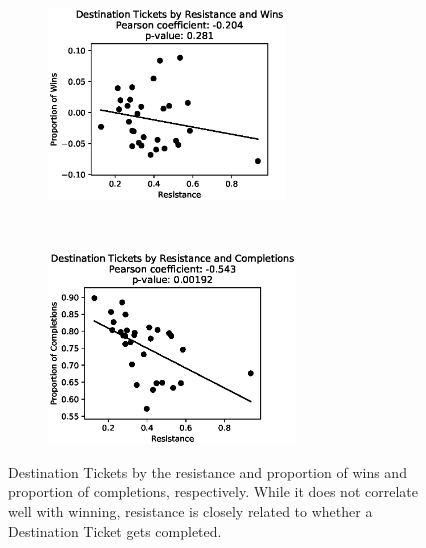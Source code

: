 \begin{figure}[H]
    \centering
    \begin{subfigure}[t]{0.5\textwidth}
        \centering
        \includegraphics[height=2in]{figures/correlation1}
    \end{subfigure}%
    ~ 
    \begin{subfigure}[t]{0.5\textwidth}
        \centering
        \includegraphics[height=2in]{figures/completion}
    \end{subfigure}%
    \caption{Destination Tickets by the resistance and
    proportion of wins and proportion of completions,
    respectively.
    While it does not correlate well with
    winning, resistance is closely related to
    whether a Destination Ticket gets completed.
    }
    \label{fig:completion}
\end{figure}
 
